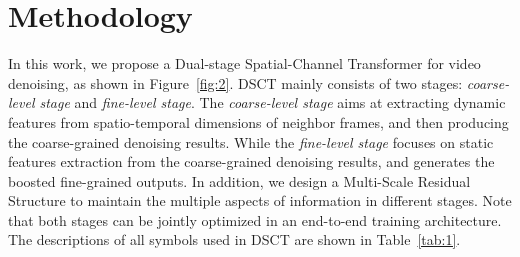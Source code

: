 \documentclass[journal]{IEEEtran}
\begin{document}
\section{Methodology}
In this work, we propose a Dual-stage Spatial-Channel Transformer for video denoising, as shown in Figure~\ref{fig:2}. DSCT mainly consists of two stages: \emph{coarse-level stage} and \emph{fine-level stage}. The \emph{coarse-level stage} aims at extracting dynamic features from spatio-temporal dimensions of neighbor frames, and then producing the coarse-grained denoising results. While the \emph{fine-level stage} focuses on static features extraction from the coarse-grained denoising results, and generates the boosted fine-grained outputs. In addition, we design a Multi-Scale Residual Structure to maintain the multiple aspects of information in different stages. Note that both stages can be jointly optimized in an end-to-end training architecture. The descriptions of all symbols used in DSCT are shown in Table~\ref{tab:1}.
\end{document}
